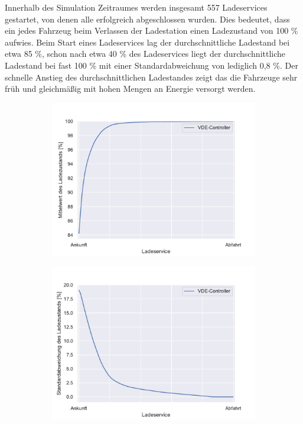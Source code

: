Innerhalb des Simulation Zeitraumes werden insgesamt 557 Ladeservices gestartet, von denen alle erfolgreich abgeschlossen wurden. Dies bedeutet, dass ein jedes Fahrzeug beim Verlassen der Ladestation einen Ladezustand von 100 \% aufwies. Beim Start eines Ladeservices lag der durchschnittliche Ladestand bei etwa 85 \%, schon nach etwa 40 \% des Ladeservices liegt der durchschnittliche Ladestand bei fast 100 \% mit einer Standardabweichung von lediglich 0,8 \%. Der schnelle Anstieg des durchschnittlichen Ladestandes zeigt das die Fahrzeuge sehr früh und gleichmäßig mit hohen Mengen an Energie versorgt werden. \\
\begin{figure}
	\begin{subfigure}{0.49\linewidth}
		\includegraphics[width=\linewidth]{img/VDE_tau/tau_VDE_2_soc_mean.pdf}
        \label{ABB_VDEtauSocMEAN}
	\end{subfigure}
	\begin{subfigure}{0.49\linewidth}
		\includegraphics[width=\linewidth]{img/VDE_tau/tau_VDE_2_soc_std.pdf}

\end{subfigure}
\end{figure}
